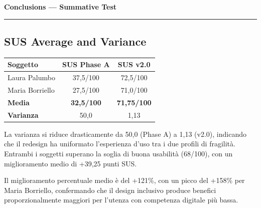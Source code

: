 ﻿\documentclass[11pt,a4paper]{article}
\begin{document}

\newpage
\begin{center}
  {\color{primaryColor}\large\bfseries Conclusions --- Summative Test}\\
  \vspace{0.1cm}
  \color{borderColor}\hrule
\end{center}

\vspace{0.5cm}

\subsection*{SUS Average and Variance}
\begin{tcolorbox}[base]
\begin{center}
\renewcommand{\arraystretch}{1.3}
\begin{tabular}{lcc}
\toprule
\textbf{Soggetto} & \textbf{SUS Phase A} & \textbf{SUS v2.0} \\
\midrule
Laura Palumbo  & 37,5/100 & 72,5/100 \\
Maria Borriello & 27,5/100 & 71,0/100 \\
\midrule
\textbf{Media} & \textbf{32,5/100} & \textbf{71,75/100} \\
\textbf{Varianza} & 50,0 & 1,13 \\
\bottomrule
\end{tabular}
\end{center}

\medskip

La varianza si riduce drasticamente da 50,0 (Phase A) a 1,13
(v2.0), indicando che il redesign ha uniformato l'esperienza
d'uso tra i due profili di fragilità. Entrambi i soggetti
superano la soglia di buona usabilità (68/100), con un
miglioramento medio di +39,25 punti SUS.

\medskip

Il miglioramento percentuale medio è del +121\%, con un picco
del +158\% per Maria Borriello, confermando che il design
inclusivo produce benefici proporzionalmente maggiori per
l'utenza con competenza digitale più bassa.
\end{tcolorbox}
\end{document}
